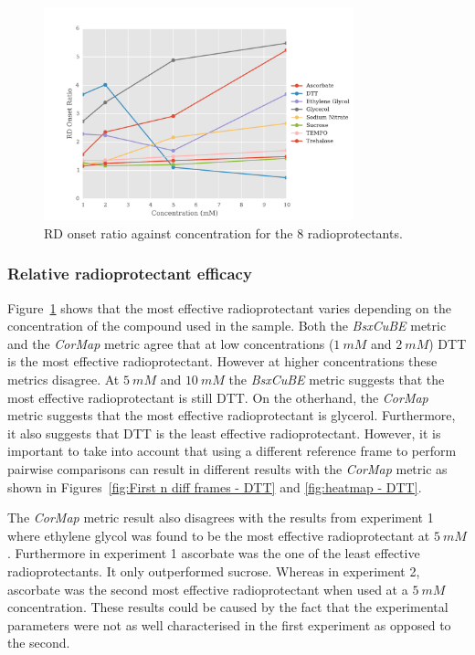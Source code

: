 \begin{figure}
    \centering
    \includegraphics[width=0.8\textwidth]{figures/saxs/RatioPlots.pdf}
    \caption{RD onset ratio against concentration for the 8 radioprotectants.}
    \label{fig:SAXS Ratio plot}
\end{figure}

\subsubsection{Relative radioprotectant efficacy}
\label{subs:Relative radioprotectant efficacy}
Figure~\ref{fig:SAXS Ratio plot} shows that the most effective radioprotectant varies depending on the concentration of the compound used in the sample.
Both the \textit{BsxCuBE} metric and the \textit{CorMap} metric agree that at low concentrations ($1\ mM$ and $2\ mM$) DTT is the most effective radioprotectant.
However at higher concentrations these metrics disagree.
At $5\ mM$ and $10\ mM$ the \textit{BsxCuBE} metric suggests that the most effective radioprotectant is still DTT.
On the otherhand, the \textit{CorMap} metric suggests that the most effective radioprotectant is glycerol.
Furthermore, it also suggests that DTT is the least effective radioprotectant.
However, it is important to take into account that using a different reference frame to perform pairwise comparisons can result in different results with the \textit{CorMap} metric as shown in Figures~\ref{fig:First n diff frames - DTT} and \ref{fig:heatmap - DTT}.

The \textit{CorMap} metric result also disagrees with the results from experiment 1 where ethylene glycol was found to be the most effective radioprotectant at $5\ mM$.
Furthermore in experiment 1 ascorbate was the one of the least effective radioprotectants.
It only outperformed sucrose.
Whereas in experiment 2, ascorbate was the second most effective radioprotectant when used at a $5\ mM$ concentration.
These results could be caused by the fact that the experimental parameters were not as well characterised in the first experiment as opposed to the second.
